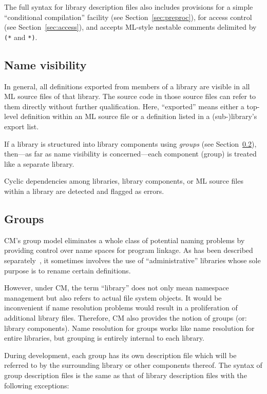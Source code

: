 \documentclass{article}
\begin{document}
The full syntax for library description files also includes provisions
for a simple ``conditional compilation'' facility (see
Section~\ref{sec:preproc}), for access control (see
Section~\ref{sec:access}), and accepts ML-style nestable comments
delimited by \verb|(*| and \verb|*)|.

\subsection{Name visibility}

In general, all definitions exported from members of a library are
visible in all ML source files of that library.  The source code in
those source files can refer to them directly without further
qualification.  Here, ``exported'' means either a top-level definition
within an ML source file or a definition listed in a (sub-)library's
export list.

If a library is structured into library components using {\em groups}
(see Section~\ref{sec:groups}), then---as far as name visibility is
concerned---each component (group) is treated like a separate library.

Cyclic dependencies among libraries, library components, or ML source
files within a library are detected and flagged as errors.

\subsection{Groups}
\label{sec:groups}

CM's group model eliminates a whole class of potential naming problems
by providing control over name spaces for program linkage. As has been
described separately~\cite{blume:appel:cm99}, it sometimes involves
the use of ``administrative'' libraries whose sole purpose is to
rename certain definitions.

However, under CM, the term ``library'' does not only mean namespace
management but also refers to actual file system objects.  It would be
inconvenient if name resolution problems would result in a
proliferation of additional library files.  Therefore, CM also
provides the notion of groups (or: library components).  Name
resolution for groups works like name resolution for entire libraries,
but grouping is entirely internal to each library.

During development, each group has its own description file which will
be referred to by the surrounding library or other components thereof.
The syntax of group description files is the same as that of library
description files with the following exceptions:
\end{document}
